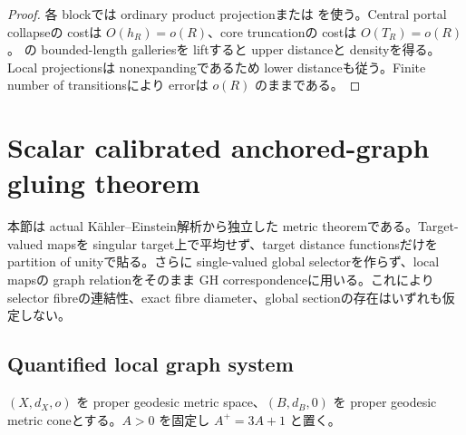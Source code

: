 \documentclass[11pt,a4paper]{ltjsarticle}
\theoremstyle{plain}
\theoremstyle{definition}
\theoremstyle{remark}
\begin{document}
\begin{proof}
各 blockでは ordinary product projectionまたは  を使う。Central portal collapseの costは $O(h_R)=o(R)$、core truncationの costは $O(T_R)=o(R)$。 の bounded-length galleriesを liftすると upper distanceと densityを得る。Local projectionsは nonexpandingであるため lower distanceも従う。Finite number of transitionsにより errorは $o(R)$ のままである。
\end{proof}

\section{Scalar calibrated anchored-graph gluing theorem}\label{sec:calibration}

本節は actual K\"ahler--Einstein解析から独立した metric theoremである。Target-valued mapsを singular target上で平均せず、target distance functionsだけを partition of unityで貼る。さらに single-valued global selectorを作らず、local mapsの graph relationをそのまま GH correspondenceに用いる。これにより selector fibreの連結性、exact fibre diameter、global sectionの存在はいずれも仮定しない。

\subsection{Quantified local graph system}
$(X,d_X,o)$ を proper geodesic metric space、$(B,d_B,0)$ を proper geodesic metric coneとする。$A>0$ を固定し $A^+=3A+1$ と置く。
\end{document}

